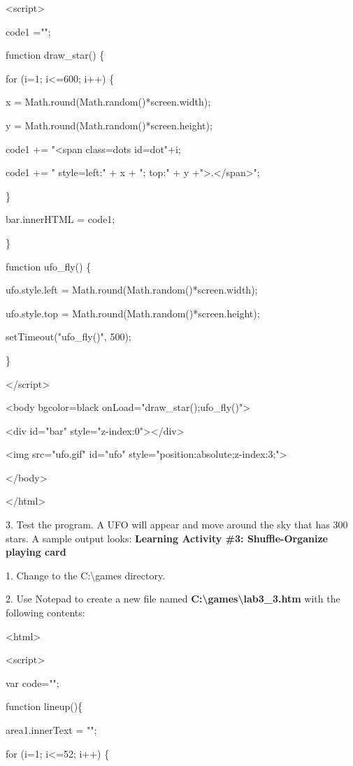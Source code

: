\documentclass[
]{article}
\begin{document}
\textless script\textgreater{}

code1 ="";

function draw\_star() \{

for (i=1; i\textless=600; i++) \{

x = Math.round(Math.random()*screen.width);

y = Math.round(Math.random()*screen.height);

code1 += "\textless span class=dots id=dot"+i;

code1 += " style=\textquotesingle left:" + x + "; top:" + y
+"\textquotesingle\textgreater.\textless/span\textgreater";

\}

bar.innerHTML = code1;

\}

function ufo\_fly() \{

ufo.style.left = Math.round(Math.random()*screen.width);

ufo.style.top = Math.round(Math.random()*screen.height);

setTimeout("ufo\_fly()", 500);

\}

\textless/script\textgreater{}

\textless body bgcolor=black
onLoad="draw\_star();ufo\_fly()"\textgreater{}

\textless div id="bar"
style="z-index:0"\textgreater\textless/div\textgreater{}

\textless img src="ufo.gif" id="ufo"
style="position:absolute;z-index:3;"\textgreater{}

\textless/body\textgreater{}

\textless/html\textgreater{}

3. Test the program. A UFO will appear and move around the sky that has
300 stars. A sample output looks: \textbf{Learning Activity \#3:
Shuffle-Organize playing card}

1. Change to the C:\textbackslash games directory.

2. Use Notepad to create a new file named
\textbf{C:\textbackslash games\textbackslash lab3\_3.htm} with the
following contents:

\textless html\textgreater{}

\textless script\textgreater{}

var code="";

function lineup()\{

area1.innerText = "";

for (i=1; i\textless=52; i++) \{
\end{document}

